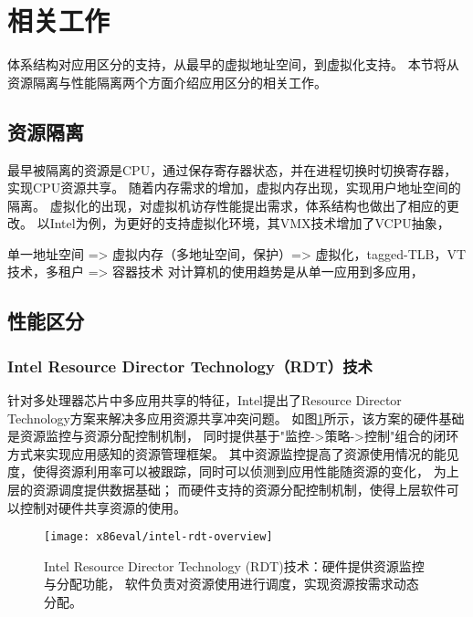 \section{相关工作}

体系结构对应用区分的支持，从最早的虚拟地址空间，到虚拟化支持。
本节将从资源隔离与性能隔离两个方面介绍应用区分的相关工作。

\subsection{资源隔离}

最早被隔离的资源是CPU，通过保存寄存器状态，并在进程切换时切换寄存器，实现CPU资源共享。
随着内存需求的增加，虚拟内存出现，实现用户地址空间的隔离。
虚拟化的出现，对虚拟机访存性能提出需求，体系结构也做出了相应的更改。
以Intel为例，为更好的支持虚拟化环境，其VMX技术增加了VCPU抽象，

单一地址空间 => 虚拟内存（多地址空间，保护）=> 虚拟化，tagged-TLB，VT技术，多租户
                                            => 容器技术
对计算机的使用趋势是从单一应用到多应用，

\subsection{性能区分}

\subsubsection*{Intel Resource Director Technology（RDT）技术}

针对多处理器芯片中多应用共享的特征，Intel提出了Resource Director Technology方案来解决多应用资源共享冲突问题。
如图\ref{fig:intel-rdt-overview}所示，该方案的硬件基础是资源监控与资源分配控制机制，
同时提供基于"监控->策略->控制"组合的闭环方式来实现应用感知的资源管理框架。
其中资源监控提高了资源使用情况的能见度，使得资源利用率可以被跟踪，同时可以侦测到应用性能随资源的变化，
为上层的资源调度提供数据基础；
而硬件支持的资源分配控制机制，使得上层软件可以控制对硬件共享资源的使用。

\begin{figure}[H]
  \centering
  \texttt{[image: x86eval/intel-rdt-overview]}
  \caption[Intel Resource Director Technology (RDT) 技术示意图]{
    Intel Resource Director Technology (RDT)技术：硬件提供资源监控与分配功能，
    软件负责对资源使用进行调度，实现资源按需求动态分配。}
  \label{fig:intel-rdt-overview}
\end{figure}

